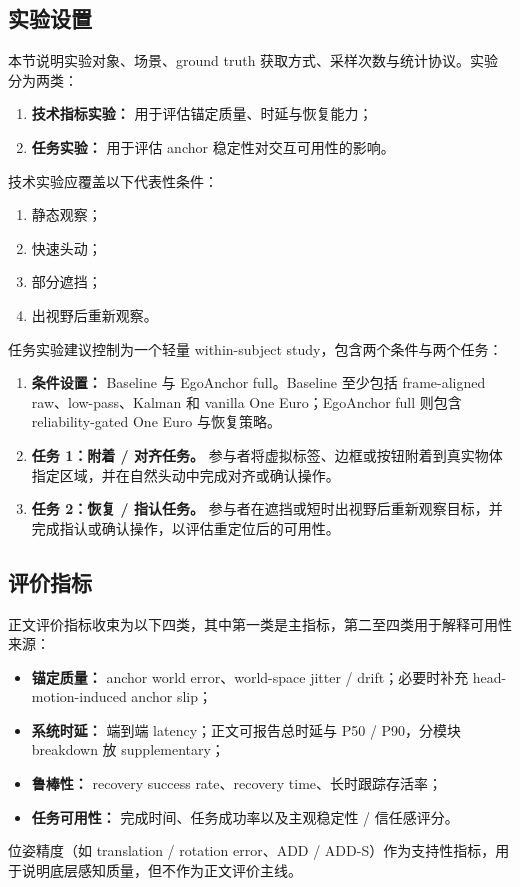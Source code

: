 \documentclass[review]{vgtc}
\begin{document}
\subsection{实验设置}
本节说明实验对象、场景、ground truth 获取方式、采样次数与统计协议。实验分为两类：
\begin{enumerate}[label=\arabic*.]
  \item \textbf{技术指标实验：} 用于评估锚定质量、时延与恢复能力；
  \item \textbf{任务实验：} 用于评估 anchor 稳定性对交互可用性的影响。
\end{enumerate}
技术实验应覆盖以下代表性条件：
\begin{enumerate}
  \item 静态观察；
  \item 快速头动；
  \item 部分遮挡；
  \item 出视野后重新观察。
\end{enumerate}
任务实验建议控制为一个轻量 within-subject study，包含两个条件与两个任务：
\begin{enumerate}[label=\alph*.]
  \item \textbf{条件设置：} Baseline 与 EgoAnchor full。Baseline 至少包括 frame-aligned raw、low-pass、Kalman 和 vanilla One Euro；EgoAnchor full 则包含 reliability-gated One Euro 与恢复策略。
  \item \textbf{任务 1：附着 / 对齐任务。} 参与者将虚拟标签、边框或按钮附着到真实物体指定区域，并在自然头动中完成对齐或确认操作。
  \item \textbf{任务 2：恢复 / 指认任务。} 参与者在遮挡或短时出视野后重新观察目标，并完成指认或确认操作，以评估重定位后的可用性。
\end{enumerate}

\subsection{评价指标}
正文评价指标收束为以下四类，其中第一类是主指标，第二至四类用于解释可用性来源：
\begin{itemize}
  \item \textbf{锚定质量：} anchor world error、world-space jitter / drift；必要时补充 head-motion-induced anchor slip；
  \item \textbf{系统时延：} 端到端 latency；正文可报告总时延与 P50 / P90，分模块 breakdown 放 supplementary；
  \item \textbf{鲁棒性：} recovery success rate、recovery time、长时跟踪存活率；
  \item \textbf{任务可用性：} 完成时间、任务成功率以及主观稳定性 / 信任感评分。
\end{itemize}
位姿精度（如 translation / rotation error、ADD / ADD-S）作为支持性指标，用于说明底层感知质量，但不作为正文评价主线。
\end{document}
